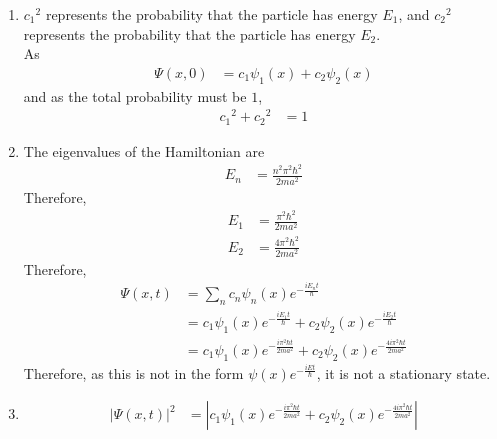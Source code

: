 \documentclass[fleqn, a4paper, 11pt, oneside]{amsart}
\theoremstyle{definition}
\theoremstyle{theorem}
\begin{document}
\begin{solution}
	\begin{enumerate}[leftmargin=*]
		\item
			${c_1}^2$ represents the probability that the particle has energy $E_1$, and ${c_2}^2$ represents the probability that the particle has energy $E_2$.\\
			As
			\begin{align*}
				\Psi(x,0) & = c_1 \psi_1(x) + c_2 \psi_2(x)
			\end{align*}
			and as the total probability must be $1$,
			\begin{align*}
				{c_1}^2 + {c_2}^2 & = 1
			\end{align*}
		\item
			The eigenvalues of the Hamiltonian are
			\begin{align*}
				E_n & = \frac{n^2 \pi^2 \hbar^2}{2 m a^2}
			\end{align*}
			Therefore,
			\begin{align*}
				E_1 & = \frac{\pi^2 \hbar^2}{2 m a^2} \\
				E_2 & = \frac{4 \pi^2 \hbar^2}{2 m a^2}
			\end{align*}
			Therefore,
			\begin{align*}
				\Psi(x,t) & = \sum\limits_{n} c_n \psi_n(x) e^{-\frac{i E_n t}{\hbar}}                            \\
                                          & = c_1 \psi_1(x) e^{-\frac{i E_1 t}{\hbar}} + c_2 \psi_2(x) e^{-\frac{i E_2 t}{\hbar}} \\
                                          & = c_1 \psi_1(x) e^{-\frac{i \pi^2 \hbar t}{2 m a^2}} + c_2 \psi_2(x) e^{-\frac{4 i \pi^2 \hbar t}{2 m a^2}}
			\end{align*}
			Therefore, as this is not in the form $\psi(x) e^{-\frac{i E t}{\hbar}}$, it is not a stationary state.
		\item
			\begin{align*}
				\left| \Psi(x,t) \right|^2 & = \left| c_1 \psi_1(x) e^{-\frac{i \pi^2 \hbar t}{2 m a^2}} + c_2 \psi_2(x) e^{-\frac{4 i \pi^2 \hbar t}{2 m a^2}} \right|
			\end{align*}
	\end{enumerate}
\end{solution}
\end{document}
